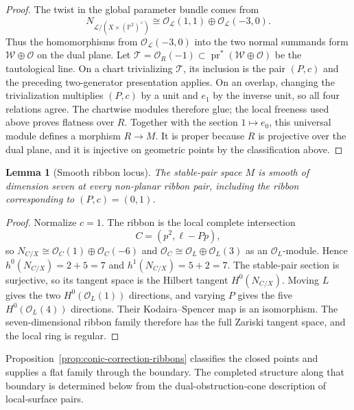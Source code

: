 \documentclass[11pt,reqno]{amsart}
\newtheorem{lemma}[theorem]{Lemma}
\theoremstyle{definition}
\newcommand{\Pp}{\mathbb P}
\newcommand{\Ocal}{\mathcal O}
\begin{document}
\begin{proof}
The twist in the global parameter bundle comes from
\[
 N_{\mathcal L/(X\times(\Pp^2)^\vee)}
 \cong\Ocal_{\mathcal L}(1,1)\oplus\Ocal_{\mathcal L}(-3,0).
\]
Thus the homomorphisms from $\Ocal_{\mathcal L}(-3,0)$ into the two normal
summands form
$\mathcal W\oplus\Ocal$ on the dual plane.  Let
$\mathcal T=\Ocal_R(-1)\subset
\operatorname{pr}^*(\mathcal W\oplus\Ocal)$ be the tautological line.  On
a chart trivializing $\mathcal T$, its inclusion is the pair $(P,c)$ and
the preceding two-generator presentation applies.  On an overlap, changing
the trivialization multiplies $(P,c)$ by a unit and $e_1$ by the inverse
unit, so all four relations agree.  The chartwise modules therefore glue;
the local freeness used above proves flatness over $R$.  Together with the
section $1\mapsto e_0$, this universal module defines a morphism $R\to M$.
It is proper because $R$ is projective over the dual plane, and it is
injective on geometric points by the classification above.
\end{proof}

\begin{lemma}[Smooth ribbon locus]\label{lem:smooth-ribbon-locus}
The stable-pair space $M$ is smooth of dimension seven at every non-planar
ribbon pair, including the ribbon corresponding to $(P,c)=(0,1)$.
\end{lemma}

\begin{proof}
Normalize $c=1$.  The ribbon is the local complete intersection
\[
 C=(p^2,\ell-Pp),
 \]
so
$N_{C/X}\cong\Ocal_C(1)\oplus\Ocal_C(-6)$ and
$\Ocal_C\cong\Ocal_L\oplus\Ocal_L(3)$ as an $\Ocal_L$-module.  Hence
$h^0(N_{C/X})=2+5=7$ and $h^1(N_{C/X})=5+2=7$.  The stable-pair section is
surjective, so its tangent space is the Hilbert tangent
$H^0(N_{C/X})$.  Moving $L$ gives the two
$H^0(\Ocal_L(1))$ directions, and varying $P$ gives the five
$H^0(\Ocal_L(4))$ directions.  Their Kodaira--Spencer map is an
isomorphism.  The seven-dimensional ribbon family therefore has the full
Zariski tangent space, and the local ring is regular.
\end{proof}

Proposition~\ref{prop:conic-correction-ribbons} classifies the closed points
and supplies a flat family through the boundary.  The completed structure
along that boundary is determined below from the dual-obstruction-cone
description of local-surface pairs.
\end{document}
